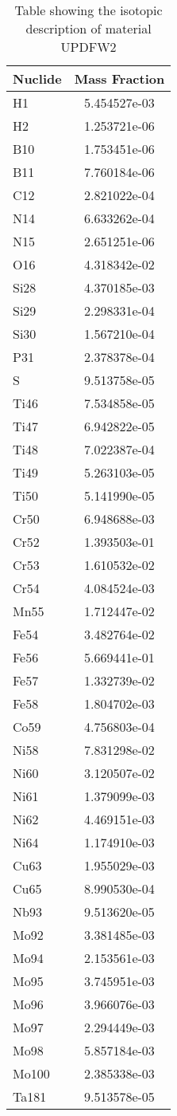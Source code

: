\begin{centering}
\begin{table}[ht!]
\begin{tabular}{l | c}
\hline
Nuclide & Mass Fraction\\
\hline
H1 & 5.454527e-03\\
H2 & 1.253721e-06\\
B10 & 1.753451e-06\\
B11 & 7.760184e-06\\
C12 & 2.821022e-04\\
N14 & 6.633262e-04\\
N15 & 2.651251e-06\\
O16 & 4.318342e-02\\
Si28 & 4.370185e-03\\
Si29 & 2.298331e-04\\
Si30 & 1.567210e-04\\
P31 & 2.378378e-04\\
S & 9.513758e-05\\
Ti46 & 7.534858e-05\\
Ti47 & 6.942822e-05\\
Ti48 & 7.022387e-04\\
Ti49 & 5.263103e-05\\
Ti50 & 5.141990e-05\\
Cr50 & 6.948688e-03\\
Cr52 & 1.393503e-01\\
Cr53 & 1.610532e-02\\
Cr54 & 4.084524e-03\\
Mn55 & 1.712447e-02\\
Fe54 & 3.482764e-02\\
Fe56 & 5.669441e-01\\
Fe57 & 1.332739e-02\\
Fe58 & 1.804702e-03\\
Co59 & 4.756803e-04\\
Ni58 & 7.831298e-02\\
Ni60 & 3.120507e-02\\
Ni61 & 1.379099e-03\\
Ni62 & 4.469151e-03\\
Ni64 & 1.174910e-03\\
Cu63 & 1.955029e-03\\
Cu65 & 8.990530e-04\\
Nb93 & 9.513620e-05\\
Mo92 & 3.381485e-03\\
Mo94 & 2.153561e-03\\
Mo95 & 3.745951e-03\\
Mo96 & 3.966076e-03\\
Mo97 & 2.294449e-03\\
Mo98 & 5.857184e-03\\
Mo100 & 2.385338e-03\\
Ta181 & 9.513578e-05
\end{tabular}
\caption{Table showing the isotopic description of material UPDFW2}
\label{table:material_UPDFW2}
\end{table}\clearpage


\end{centering}
